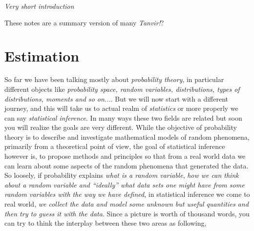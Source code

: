 \documentclass[ 11pt,%
				a4paper,%
				twoside,%
				headinclude,%
				footinclude = true,%
				cleardoublepage = empty,%
				reqno]{scrbook}
\begin{document}

\begin{titlepage}
\vspace{1em}
{\hfill\itshape Very short introduction}
\clearpage
    \vspace*{\fill}\hfill   \parbox{.4\textwidth}{
    \raggedleft
\scriptsize These notes are a summary version of many  \emph{Tanvir!}?
}
\end{titlepage}

\begingroup
\hypersetup{linkcolor=gainsboro!60!black}
\tableofcontents
\endgroup
\frontmatter


\setcounter{chapter}{3}
\mainmatter
\chapter{Estimation}



So far we have been talking mostly about \emph{probability theory}, in particular different objects like \textit{probability space, random variables, distributions, types of distributions, moments and so on...}. %
%
But we will now start with a different journey, and this will take us to actual realm of \emph{statistics} or more properly we can say \emph{statistical inference}. In many ways these two fields are related but soon you will realize the goals are very different. While the objective of probability theory is to describe and investigate mathematical models of random phenomena, primarily from a theoretical point of view, the goal of statistical inference however is, to propose methods and principles so that from a real world data we can learn about some aspects of the random phenomena that generated the data. So loosely, if probability explains \emph{what is a random variable}, \emph{how we can think about a random variable and ``ideally'' what data sets one might have from some random variables with the way we have defined}, in statistical inference we come to real world, \emph{we collect the data and model some unknown but useful quantities and then try to guess it with the data}. Since a picture is worth of thousand words, you can try to think the interplay between these two areas as following,
\end{document}
